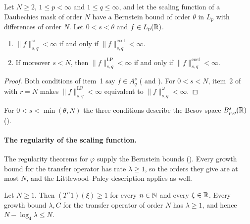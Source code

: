 \begin{theorem}
\label{thm:daub-besov}
\leanok
{}
Let $N \geq 2$, $1 \leq p < \infty$ and $1 \leq q \leq \infty$, and let the scaling function of a
Daubechies mask of order $N$ have a Bernstein bound of order $\theta$ in $L_p$ with differences of
order $N$. Let $0 < s < \theta$ and $f \in L_p(\mathbb{R})$.
\begin{enumerate}
  \item $\|f\|^{\omega}_{s,q} < \infty$ if and only if $\|f\|^{\mathrm{coef}}_{s,q} < \infty$.
  \item If moreover $s < N$, then $\|f\|^{\mathrm{LP}}_{s,q} < \infty$ if and only if
    $\|f\|^{\mathrm{coef}}_{s,q} < \infty$.
\end{enumerate}
\end{theorem}

\begin{proof}
\leanok
{}
Both conditions of item~1 say $f \in A^s_q$
( and ). For $0 < s < N$, item~2 of
 with $r = N$ makes $\|f\|^{\mathrm{LP}}_{s,q} < \infty$ equivalent to
$\|f\|^{\omega}_{s,q} < \infty$.
\end{proof}

For $0 < s < \min(\theta, N)$ the three conditions describe the Besov space
$B^{s}_{p,q}(\mathbb{R})$ ().

\paragraph{The regularity of the scaling function.}
The regularity theorems for $\varphi$ supply the Bernstein bounds
(). Every growth bound for the transfer operator has rate
$\lambda \geq 1$, so the orders they give are at most $N$, and the Littlewood--Paley description
applies as well.

\begin{lemma}
\label{lem:daub-growth-rate}
\leanok
{}
Let $N \geq 1$. Then $(T^n 1)(\xi) \geq 1$ for every $n \in \mathbb{N}$ and every $\xi \in \mathbb{R}$. Every
growth bound $\lambda, C$ for the transfer operator of order $N$ has $\lambda \geq 1$, and hence
$N - \log_4 \lambda \leq N$.
\end{lemma}

